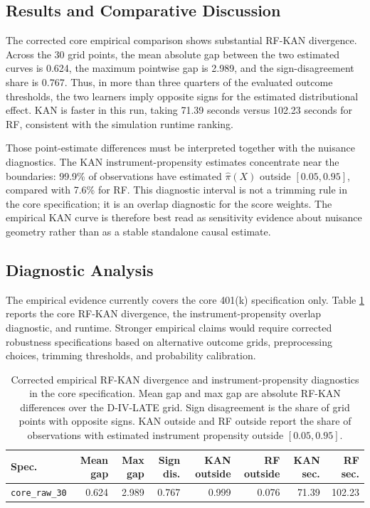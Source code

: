\documentclass[final,3p,fleqn, 10pt]{elsarticle}
\begin{document}
\subsection{Results and Comparative Discussion}
The corrected core empirical comparison shows substantial RF-KAN divergence. Across the 30 grid points, the mean absolute gap between the two estimated curves is 0.624, the maximum pointwise gap is 2.989, and the sign-disagreement share is 0.767. Thus, in more than three quarters of the evaluated outcome thresholds, the two learners imply opposite signs for the estimated distributional effect. KAN is faster in this run, taking 71.39 seconds versus 102.23 seconds for RF, consistent with the simulation runtime ranking.

Those point-estimate differences must be interpreted together with the nuisance diagnostics. The KAN instrument-propensity estimates concentrate near the boundaries: 99.9\% of observations have estimated $\hat{\pi}(X)$ outside $[0.05,0.95]$, compared with 7.6\% for RF. This diagnostic interval is not a trimming rule in the core specification; it is an overlap diagnostic for the score weights. The empirical KAN curve is therefore best read as sensitivity evidence about nuisance geometry rather than as a stable standalone causal estimate.

\subsection{Diagnostic Analysis}
\label{sec:robustness_empirical}

The empirical evidence currently covers the core 401(k) specification only. Table \ref{tab:empirical_core_diagnostics} reports the core RF-KAN divergence, the instrument-propensity overlap diagnostic, and runtime. Stronger empirical claims would require corrected robustness specifications based on alternative outcome grids, preprocessing choices, trimming thresholds, and probability calibration.

\begin{table}[htbp]
\centering
\caption{Corrected empirical RF-KAN divergence and instrument-propensity diagnostics in the core specification. Mean gap and max gap are absolute RF-KAN differences over the D-IV-LATE grid. Sign disagreement is the share of grid points with opposite signs. KAN outside and RF outside report the share of observations with estimated instrument propensity outside $[0.05,0.95]$.}
\label{tab:empirical_core_diagnostics}
\small
\begin{tabular}{@{}lrrrrrrr@{}}
\toprule
Spec. & Mean gap & Max gap & Sign dis. & KAN outside & RF outside & KAN sec. & RF sec. \\
\midrule
\texttt{core\_raw\_30} & 0.624 & 2.989 & 0.767 & 0.999 & 0.076 & 71.39 & 102.23 \\
\bottomrule
\end{tabular}
\end{table}
\end{document}
